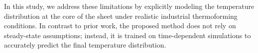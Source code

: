In this study, we address these limitations by explicitly modeling the temperature distribution at the core of the sheet under realistic industrial thermoforming conditions. In contrast to prior work, the proposed method does not rely on steady-state assumptions; instead, it is trained on time-dependent simulations to accurately predict the final temperature distribution.